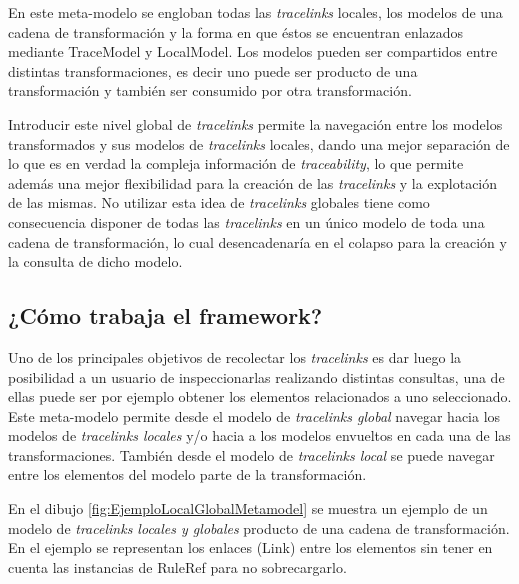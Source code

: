 \documentclass[a4paper,12pt,oneside,spanish]{book}
\begin{document}
En este meta-modelo se engloban todas las \textit{tracelinks} locales, los modelos de una cadena de transformación y la forma en que éstos se encuentran enlazados mediante \textsf{TraceModel} y \textsf{LocalModel}. Los modelos pueden ser compartidos entre distintas transformaciones, es decir uno puede ser producto de una transformación y también ser consumido por otra transformación.

Introducir este nivel global de \textit{tracelinks} permite la navegación entre los modelos transformados y sus modelos de \textit{tracelinks} locales, dando una mejor separación de lo que es en verdad la compleja información de \textit{traceability}, lo que permite además una mejor flexibilidad para la creación de las \textit{tracelinks} y la explotación de las mismas. No utilizar esta idea de \textit{tracelinks} globales tiene como consecuencia disponer de todas las \textit{tracelinks} en un único modelo de toda una cadena de transformación, lo cual desencadenaría en el colapso para la creación y la consulta de dicho modelo.

\subsection{¿Cómo trabaja el framework?}

Uno de los principales objetivos de recolectar los \textit{tracelinks} es dar luego la posibilidad a un usuario de inspeccionarlas realizando distintas consultas, una de ellas puede ser por ejemplo obtener los elementos relacionados a uno seleccionado. Este meta-modelo permite desde el modelo de \textit{tracelinks global} navegar hacia los modelos de \textit{tracelinks locales} y/o hacia a los modelos envueltos en cada una de las transformaciones. También desde el modelo de \textit{tracelinks local} se puede navegar entre los elementos del modelo parte de la transformación.

En el dibujo \ref{fig:EjemploLocalGlobalMetamodel} se muestra un ejemplo de un modelo de \textit{tracelinks locales y globales} producto de una cadena de transformación. En el ejemplo se representan los enlaces (\textsf{Link}) entre los elementos sin tener en cuenta las instancias de \textsf{RuleRef} para no sobrecargarlo.
\end{document}
